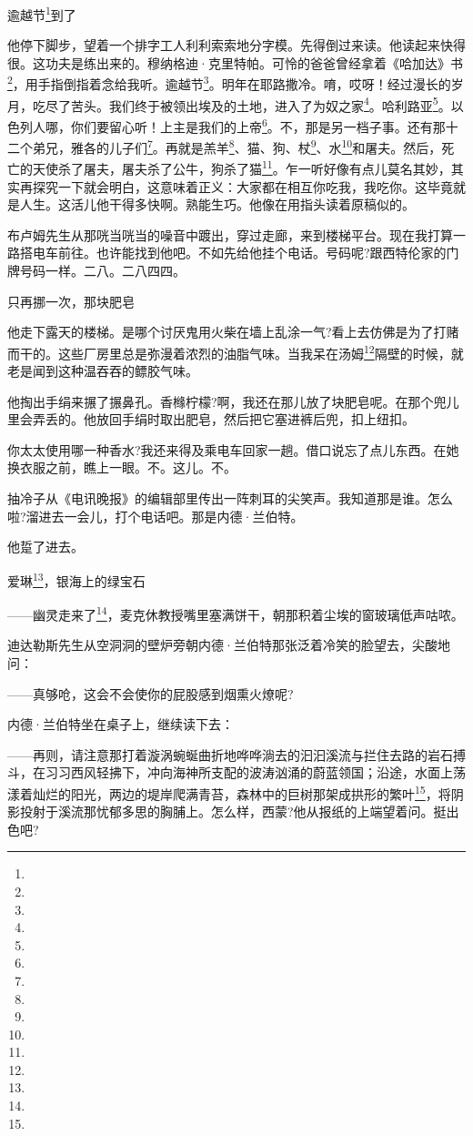 \par 逾越节\footnote{}到了
\par 他停下脚步，望着一个排字工人利利索索地分字模。先得倒过来读。他读起来快得很。这功夫是练出来的。穆纳格迪·克里特帕。可怜的爸爸曾经拿着《哈加达》书\footnote{}，用手指倒指着念给我听。逾越节\footnote{}。明年在耶路撒冷。唷，哎呀！经过漫长的岁月，吃尽了苦头。我们终于被领出埃及的土地，进入了为奴之家\footnote{}。哈利路亚\footnote{}。以色列人哪，你们要留心听！上主是我们的上帝\footnote{}。不，那是另一档子事。还有那十二个弟兄，雅各的儿子们\footnote{}。再就是羔羊\footnote{}、猫、狗、杖\footnote{}、水\footnote{}和屠夫。然后，死亡的天使杀了屠夫，屠夫杀了公牛，狗杀了猫\footnote{}。乍一听好像有点儿莫名其妙，其实再探究一下就会明白，这意味着正义：大家都在相互你吃我，我吃你。这毕竟就是人生。这活儿他干得多快啊。熟能生巧。他像在用指头读着原稿似的。
\par 布卢姆先生从那咣当咣当的噪音中踱出，穿过走廊，来到楼梯平台。现在我打算一路搭电车前往。也许能找到他吧。不如先给他挂个电话。号码呢?跟西特伦家的门牌号码一样。二八。二八四四。
\par 只再挪一次，那块肥皂
\par 他走下露天的楼梯。是哪个讨厌鬼用火柴在墙上乱涂一气?看上去仿佛是为了打赌而干的。这些厂房里总是弥漫着浓烈的油脂气味。当我呆在汤姆\footnote{}隔壁的时候，就老是闻到这种温吞吞的鳔胶气味。
\par 他掏出手绢来搌了搌鼻孔。香橼柠檬?啊，我还在那儿放了块肥皂呢。在那个兜儿里会弄丢的。他放回手绢时取出肥皂，然后把它塞进裤后兜，扣上纽扣。
\par 你太太使用哪一种香水?我还来得及乘电车回家一趟。借口说忘了点儿东西。在她换衣服之前，瞧上一眼。不。这儿。不。
\par 抽冷子从《电讯晚报》的编辑部里传出一阵刺耳的尖笑声。我知道那是谁。怎么啦?溜进去一会儿，打个电话吧。那是内德·兰伯特。
\par 他踅了进去。
\par 爱琳\footnote{}，银海上的绿宝石
\par ——幽灵走来了\footnote{}，麦克休教授嘴里塞满饼干，朝那积着尘埃的窗玻璃低声咕哝。
\par 迪达勒斯先生从空洞洞的壁炉旁朝内德·兰伯特那张泛着冷笑的脸望去，尖酸地问：
\par ——真够呛，这会不会使你的屁股感到烟熏火燎呢?
\par 内德·兰伯特坐在桌子上，继续读下去：
\par ——再则，请注意那打着漩涡蜿蜒曲折地哗哗淌去的汩汩溪流与拦住去路的岩石搏斗，在习习西风轻拂下，冲向海神所支配的波涛汹涌的蔚蓝领国；沿途，水面上荡漾着灿烂的阳光，两边的堤岸爬满青苔，森林中的巨树那架成拱形的繁叶\footnote{}，将阴影投射于溪流那忧郁多思的胸脯上。怎么样，西蒙?他从报纸的上端望着问。挺出色吧?
